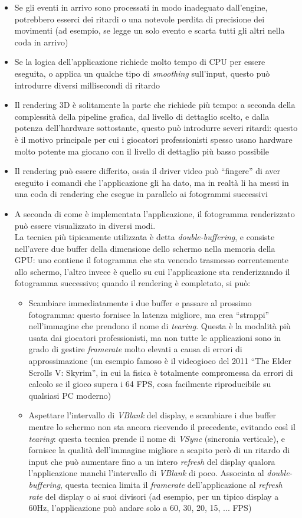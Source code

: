 \begin{itemize}
	\item Se gli eventi in arrivo sono processati in modo inadeguato dall'engine, potrebbero esserci dei ritardi o una notevole perdita di precisione dei movimenti (ad esempio, se legge un solo evento e scarta tutti gli altri nella coda in arrivo)
	\item Se la logica dell'applicazione richiede molto tempo di CPU per essere eseguita, o applica un qualche tipo di \textit{smoothing} sull'input, questo può introdurre diversi millisecondi di ritardo
	\item Il rendering 3D è solitamente la parte che richiede più tempo: a seconda della complessità della pipeline grafica, dal livello di dettaglio scelto, e dalla potenza dell'hardware sottostante, questo può introdurre severi ritardi: questo è il motivo principale per cui i giocatori professionisti spesso usano hardware molto potente ma giocano con il livello di dettaglio più basso possibile
	\item Il rendering può essere differito, ossia il driver video può ``fingere'' di aver eseguito i comandi che l'applicazione gli ha dato, ma in realtà li ha messi in una coda di rendering che esegue in parallelo ai fotogrammi successivi
	\item A seconda di come è implementata l'applicazione, il fotogramma renderizzato può essere visualizzato in diversi modi.\\
	La tecnica più tipicamente utilizzata è detta \textit{double-buffering}, e consiste nell'avere due buffer della dimensione dello schermo nella memoria della GPU: uno contiene il fotogramma che sta venendo trasmesso correntemente allo schermo, l'altro invece è quello su cui l'applicazione sta renderizzando il fotogramma successivo; quando il rendering è completato, si può:
	\begin{itemize}
		\item Scambiare immediatamente i due buffer e passare al prossimo fotogramma: questo fornisce la latenza migliore, ma crea ``strappi'' nell'immagine che prendono il nome di \textit{tearing}. Questa è la modalità più usata dai giocatori professionisti, ma non tutte le applicazioni sono in grado di gestire \textit{framerate} molto elevati a causa di errori di approssimazione (un esempio famoso è il videogioco del 2011 ``The Elder Scrolls V: Skyrim'', in cui la fisica è totalmente compromessa da errori di calcolo se il gioco supera i 64 FPS, cosa facilmente riproducibile su qualsiasi PC moderno)
		\item Aspettare l'intervallo di \textit{VBlank} del display, e scambiare i due buffer mentre lo schermo non sta ancora ricevendo il precedente, evitando così il \textit{tearing}: questa tecnica prende il nome di \textit{VSync} (sincronia verticale), e fornisce la qualità dell'immagine migliore a scapito però di un ritardo di input che può aumentare fino a un intero \textit{refresh} del display qualora l'applicazione manchi l'intervallo di \textit{VBlank} di poco. Associata al \textit{double-buffering}, questa tecnica limita il \textit{framerate} dell'applicazione al \textit{refresh rate} del display o ai suoi divisori (ad esempio, per un tipico display a 60Hz, l'applicazione può andare solo a 60, 30, 20, 15, ... FPS)

\end{itemize}
\end{itemize}
